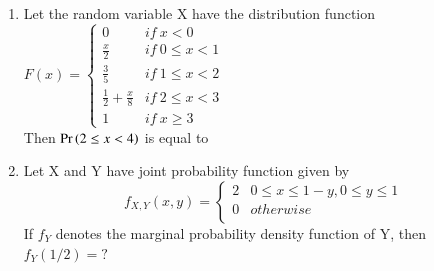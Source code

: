 \begin{enumerate}[label=\thesection.\arabic*.,ref=\thesection.\theenumi]
  \item Let the random variable X have the distribution function 
$F(x)= \begin{cases}
       0  & if \:x<0\\
       \frac{x}{2} & if\: 0 \le x <1\\
       \frac{3}{5} & if \:1 \le x <2\\
       \frac{1}{2} +\frac{x}{8} & if\: 2\le x <3\\
       1  & if\: x\ge 3
    \end{cases}$\\
Then $\Pr\left(2\le x <4\right)$ is equal to 
%
\\
  \solution
  

\item     Let X and Y have joint probability function given by\\
$$f_{X,Y}(x,y)=\left\{
\begin{array}{ll}
  2 & 0\leq x\leq 1-y,0\leq y\leq 1 \\
  0 & otherwise \\
\end{array} 
\right. $$
If $f_{Y}$ denotes the marginal probability density function of Y, then $f_{Y}(1/2)=?$
\\
\solution



\end{enumerate}

